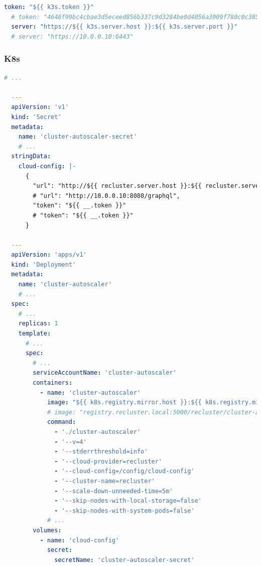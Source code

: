 \begin{lstlisting}[language=yaml, alsoletter={.}, morekeywords={[2]{token, server}}, xleftmargin=\parindent, label={lst:k3s_worker_config}, caption=TODO]
  token: "${{ k3s.token }}"
  # token: "4646f99bc4cbae3d5eceed856b337c9d3284be0d4056a3909f780c0c385fbf93"
  server: "https://${{ k3s.server.host }}:${{ k3s.server.port }}"
  # server: "https://10.0.0.10:6443"
\end{lstlisting}

\subsubsection{K8s}
\label{subsubsec:implementation_installer_configuration_filesn_k8s}

\begin{lstlisting}[language=yaml, alsoletter={.-1}, morekeywords={1}, morekeywords={[2]{apiVersion, kind, metadata, name, namespace, stringData, cloud-config, labels, app, spec, replicas, selector, matchLabels, template, serviceAccountName, tolerations, containers, image, command, volumeMounts, mountPath, readOnly, volumes, secret, secretName}}, xleftmargin=\parindent, label={lst:k8s_autoscaler_deployment}, caption=TODO]
  # ...

  ---
  apiVersion: 'v1'
  kind: 'Secret'
  metadata:
    name: 'cluster-autoscaler-secret'
    # ...
  stringData:
    cloud-config: |-
      {
        "url": "http://${{ recluster.server.host }}:${{ recluster.server.port }}                                /${{ recluster.server.path }}",
        # "url": "http://10.0.0.10:8080/graphql",
        "token": "${{ __.token }}"
        # "token": "${{ __.token }}"
      }

  ---
  apiVersion: 'apps/v1'
  kind: 'Deployment'
  metadata:
    name: 'cluster-autoscaler'
    # ...
  spec:
    # ...
    replicas: 1
    template:
      # ...
      spec:
        # ...
        serviceAccountName: 'cluster-autoscaler'
        containers:
          - name: 'cluster-autoscaler'
            image: "${{ k8s.registry.mirror.host }}:${{ k8s.registry.mirror.port }}/recluster                       /cluster-autoscaler"
            # image: "registry.recluster.local:5000/recluster/cluster-autoscaler"
            command:
              - './cluster-autoscaler'
              - '--v=4'
              - '--stderrthreshold=info'
              - '--cloud-provider=recluster'
              - '--cloud-config=/config/cloud-config'
              - '--cluster-name=recluster'
              - '--scale-down-unneeded-time=5m'
              - '--skip-nodes-with-local-storage=false'
              - '--skip-nodes-with-system-pods=false'
            # ...
        volumes:
          - name: 'cloud-config'
            secret:
              secretName: 'cluster-autoscaler-secret'
\end{lstlisting}

